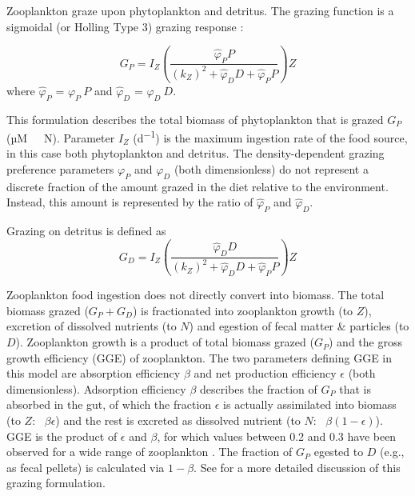 \documentclass[gmd, manuscript]{copernicus}
\begin{document}
Zooplankton graze upon phytoplankton and detritus. The grazing function is a sigmoidal (or Holling Type 3) grazing response \citep{Anderson2015c}:


\begin{equation}
    G_P = I_Z \left( \frac{ \hat{\varphi}_P P}{(k_Z)^2 + \hat{\varphi}_D D +\hat{\varphi}_P P}  \right) Z
\end{equation}
where $\hat{\varphi}_P$ = $\varphi_P \ P$ and $\hat{\varphi}_D$ = $\varphi_D \ D$.

This formulation describes the total biomass of phytoplankton that is grazed $G_P$ (\unit{µM \ N}). Parameter $I_Z$ (\unit{d^{-1}}) is the maximum ingestion rate of the food source, in this case both phytoplankton and detritus. The density-dependent grazing preference parameters $\varphi_P$ and $\varphi_D$ (both dimensionless) do not represent a discrete fraction of the amount grazed in the diet relative to the environment. Instead, this amount is represented by the ratio of $\hat{\varphi}_P$ and $\hat{\varphi}_D$.

Grazing on detritus is defined as
\begin{equation}
    G_D = I_Z \left( \frac{ \hat{\varphi}_D D}{(k_Z)^2 + \hat{\varphi}_D D +\hat{\varphi}_P P}  \right) Z
\end{equation}

Zooplankton food ingestion does not directly convert into biomass. The total biomass grazed ($G_P + G_D$) is fractionated into zooplankton growth (to $Z$), excretion of dissolved nutrients (to $N$) and egestion of fecal matter \& particles (to $D$). Zooplankton growth is a product of total biomass grazed ($G_P$) and the gross growth efficiency (GGE) of zooplankton. The two parameters defining GGE in this model are absorption efficiency $\beta$ and net production efficiency $\epsilon$ (both dimensionless). Adsorption efficiency $\beta$ describes the fraction of $G_P$ that is absorbed in the gut, of which the fraction $\epsilon$ is actually assimilated into biomass (to $Z$: \ $\beta \epsilon$) and the rest is excreted as dissolved nutrient (to $N$: \ $\beta (1-\epsilon)$). GGE is the product of $\epsilon$ and $\beta$, for which values between 0.2 and 0.3 have been observed for a wide range of zooplankton \citep{Straile1997GrossGroup}. The fraction of $G_P$ egested to $D$ (e.g., as fecal pellets) is calculated via $1-\beta$. See \citet{Anderson2015c} for a more detailed discussion of this grazing formulation.
\end{document}
